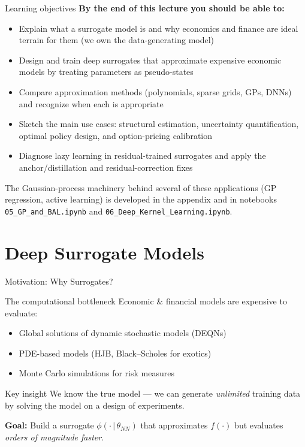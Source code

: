 \documentclass[aspectratio=169,11pt]{beamer}
\newcommand{\emphc}[1]{\textcolor{harvardcrimson}{#1}}
\begin{document}
\begin{frame}{Learning objectives}
\textbf{By the end of this lecture you should be able to:}
\begin{itemize}
  \item Explain what a surrogate model is and why economics and finance are ideal terrain for them (we own the data-generating model)
  \item Design and train deep surrogates that approximate expensive economic models by treating parameters as pseudo-states
  \item Compare approximation methods (polynomials, sparse grids, GPs, DNNs) and recognize when each is appropriate
  \item Sketch the main use cases: structural estimation, uncertainty quantification, optimal policy design, and option-pricing calibration
  \item Diagnose \emphc{lazy learning} in residual-trained surrogates and apply the anchor/distillation and residual-correction fixes
\end{itemize}
\vspace{0.3em}
{\small The Gaussian-process machinery behind several of these applications (GP regression, active learning) is developed in the \emphc{appendix} and in notebooks \texttt{05\_GP\_and\_BAL.ipynb} and \texttt{06\_Deep\_Kernel\_Learning.ipynb}.}
\end{frame}


\section{Deep Surrogate Models}

\begin{frame}{Motivation: Why Surrogates?}
\begin{block}{The computational bottleneck}
Economic \& financial models are expensive to evaluate:
\begin{itemize}
  \item Global solutions of dynamic stochastic models (DEQNs)
  \item PDE-based models (HJB, Black--Scholes for exotics)
  \item Monte Carlo simulations for risk measures
\end{itemize}
\end{block}

\vspace{0.3cm}
\begin{alertblock}{Key insight}
\emphc{We know the true model} --- we can generate \emph{unlimited} training data by solving the model on a design of experiments.
\end{alertblock}

\vspace{0.3cm}
\textbf{Goal:} Build a \emphc{surrogate} $\phi(\cdot\,|\,\theta_{NN})$ that approximates $f(\cdot)$ but evaluates \emph{orders of magnitude faster}.
\end{frame}
\end{document}

